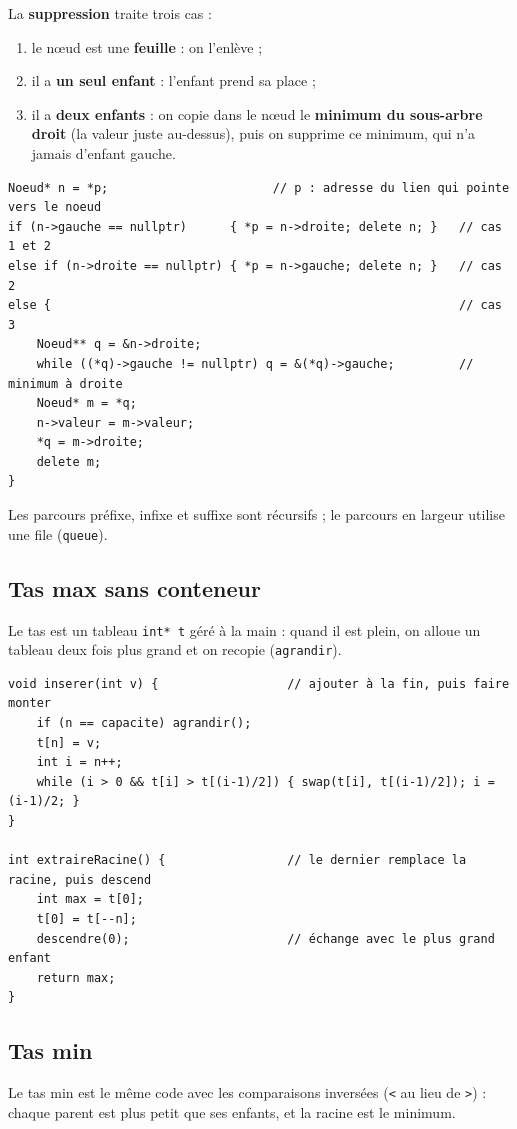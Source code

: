\documentclass[12pt,a4paper]{report}
\begin{document}
La \textbf{suppression} traite trois cas :
\begin{enumerate}
  \item le nœud est une \textbf{feuille} : on l'enlève ;
  \item il a \textbf{un seul enfant} : l'enfant prend sa place ;
  \item il a \textbf{deux enfants} : on copie dans le nœud le \textbf{minimum du sous-arbre droit} (la valeur juste au-dessus), puis on supprime ce minimum, qui n'a jamais d'enfant gauche.
\end{enumerate}
\begin{lstlisting}
Noeud* n = *p;                       // p : adresse du lien qui pointe vers le noeud
if (n->gauche == nullptr)      { *p = n->droite; delete n; }   // cas 1 et 2
else if (n->droite == nullptr) { *p = n->gauche; delete n; }   // cas 2
else {                                                         // cas 3
    Noeud** q = &n->droite;
    while ((*q)->gauche != nullptr) q = &(*q)->gauche;         // minimum à droite
    Noeud* m = *q;
    n->valeur = m->valeur;
    *q = m->droite;
    delete m;
}
\end{lstlisting}
Les parcours préfixe, infixe et suffixe sont récursifs ; le parcours en largeur utilise une file (\texttt{queue}).

\subsection{Tas max sans conteneur}
Le tas est un tableau \texttt{int* t} géré à la main : quand il est plein, on alloue un tableau deux fois plus grand et on recopie (\texttt{agrandir}).
\begin{lstlisting}
void inserer(int v) {                  // ajouter à la fin, puis faire monter
    if (n == capacite) agrandir();
    t[n] = v;
    int i = n++;
    while (i > 0 && t[i] > t[(i-1)/2]) { swap(t[i], t[(i-1)/2]); i = (i-1)/2; }
}

int extraireRacine() {                 // le dernier remplace la racine, puis descend
    int max = t[0];
    t[0] = t[--n];
    descendre(0);                      // échange avec le plus grand enfant
    return max;
}
\end{lstlisting}

\subsection{Tas min}
Le tas min est le même code avec les comparaisons inversées (\texttt{<} au lieu de \texttt{>}) : chaque parent est plus petit que ses enfants, et la racine est le minimum.
\end{document}
